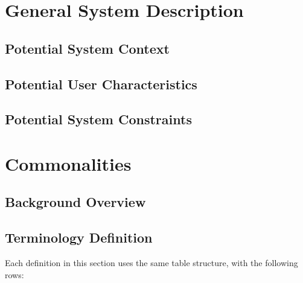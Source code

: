 \documentclass{article}
\begin{document}
\section{General System Description} \label{Sec_GenSystDescript}


\subsection{Potential System Context}


\subsection{Potential User Characteristics}

\subsection{Potential System Constraints}

\section{Commonalities} \label{Sec_Commonalities}

\subsection{Background Overview}

\subsection{Terminology Definition} \label{Sec_TerminologyDef}

Each definition in this section uses the same table structure, with the following rows:
\end{document}
